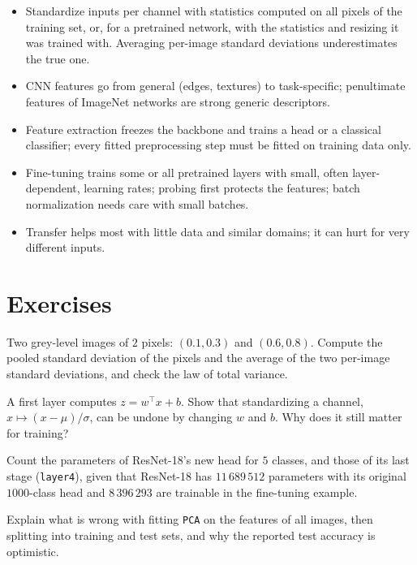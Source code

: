 \begin{notechapter}
\begin{chaptersummary}
\begin{itemize}[nosep]
  \item Standardize inputs per channel with statistics computed on all pixels of the training
        set, or, for a pretrained network, with the statistics and resizing it was trained with.
        Averaging per-image standard deviations underestimates the true one.
  \item CNN features go from general (edges, textures) to task-specific; penultimate features of
        ImageNet networks are strong generic descriptors.
  \item Feature extraction freezes the backbone and trains a head or a classical classifier;
        every fitted preprocessing step must be fitted on training data only.
  \item Fine-tuning trains some or all pretrained layers with small, often layer-dependent,
        learning rates; probing first protects the features; batch normalization needs care
        with small batches.
  \item Transfer helps most with little data and similar domains; it can hurt for very different
        inputs.
\end{itemize}
\end{chaptersummary}

\section*{Exercises}

\begin{exercise}\label{transfer-learning:exr:1}
Two grey-level images of $2$ pixels: $(0.1, 0.3)$ and $(0.6, 0.8)$. Compute the pooled standard deviation of the
pixels and the average of the two per-image standard deviations, and check the law of total
variance.
\end{exercise}

\begin{exercise}\label{transfer-learning:exr:2}
A first layer computes $z = w^\top x + b$. Show that standardizing a channel, $x\mapsto(x - \mu)/\sigma$, can be undone by
changing $w$ and $b$. Why does it still matter for training?
\end{exercise}

\begin{exercise}\label{transfer-learning:exr:3}
Count the parameters of ResNet-18's new head for $5$ classes, and those of its last stage
(\texttt{layer4}), given that ResNet-18 has $11\,689\,512$ parameters with its original $1000$-class head and $8\,396\,293$ are
trainable in the fine-tuning example.
\end{exercise}

\begin{exercise}\label{transfer-learning:exr:4}
Explain what is wrong with fitting \texttt{PCA} on the features of all images, then splitting into
training and test sets, and why the reported test accuracy is optimistic.
\end{exercise}
\end{notechapter}
